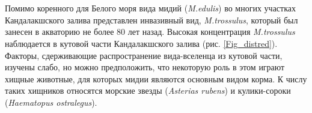\documentclass[20pt,a0,portrait]{a0poster}
\begin{document}
\begin{minipage}[t]{0.5\linewidth}		
		
% 			
% 			
% 		




		\color{Black} %



\section*{}




		
%
\begin{minipage}[t][10cm][t]{0.4\textwidth}

Помимо коренного для Белого моря вида мидий (\emph{M.edulis}) во многих участках  Кандалакшского залива представлен инвазивный вид, \emph{M.trossulus}, который был занесен в акваторию не более 80 лет назад. Высокая концентрация \emph{M.trossulus} наблюдается в кутовой части Кандалакшского залива (рис. \ref {Fig_distred}). Факторы, сдерживающие распространение  вида-вселенца из кутовой части, изучены слабо, но можно предположить, что некоторую роль в этом играют хищные животные, для которых мидии являются основным видом корма. К числу таких хищников относятся морские звезды (\emph{Asterias rubens}) и кулики-сороки (\emph{Haematopus  ostralegus}). 


\end{minipage}
\end{minipage}
\end{document}
